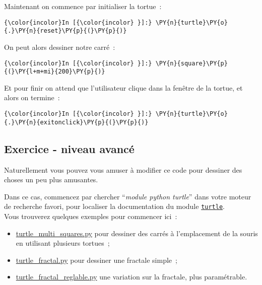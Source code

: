     Maintenant on commence par initialiser la tortue~:

    \begin{Verbatim}[commandchars=\\\{\}]
{\color{incolor}In [{\color{incolor} }]:} \PY{n}{turtle}\PY{o}{.}\PY{n}{reset}\PY{p}{(}\PY{p}{)}
\end{Verbatim}


    On peut alors dessiner notre carré~:

    \begin{Verbatim}[commandchars=\\\{\}]
{\color{incolor}In [{\color{incolor} }]:} \PY{n}{square}\PY{p}{(}\PY{l+m+mi}{200}\PY{p}{)}
\end{Verbatim}


    Et pour finir on attend que l'utilisateur clique dans la fenêtre de la
tortue, et alors on termine~:

    \begin{Verbatim}[commandchars=\\\{\}]
{\color{incolor}In [{\color{incolor} }]:} \PY{n}{turtle}\PY{o}{.}\PY{n}{exitonclick}\PY{p}{(}\PY{p}{)}
\end{Verbatim}


    \hypertarget{exercice---niveau-avancuxe9}{%
\subsection{Exercice - niveau
avancé}\label{exercice---niveau-avancuxe9}}

    Naturellement vous pouvez vous amuser à modifier ce code pour dessiner
des choses un peu plus amusantes.

Dans ce cas, commencez par chercher ``\emph{module python turtle}'' dans
votre moteur de recherche favori, pour localiser la documentation du
module
\href{https://docs.python.org/3/library/turtle.html}{\texttt{turtle}}.\\

Vous trouverez quelques exemples pour commencer ici~:

\begin{itemize}
	\item 
	\href{media/turtle_multi_squares.py}{turtle\_multi\_squares.py} pour
	dessiner des carrés à l'emplacement de la souris en utilisant plusieurs
	tortues~;
	\item
	\href{media/turtle_fractal.py}{turtle\_fractal.py} pour
	dessiner une fractale simple~;
	\item
	\href{media/turtle_fractal_reglable.py}{turtle\_fractal\_reglable.py}
	une variation sur la fractale, plus paramétrable.
\end{itemize}